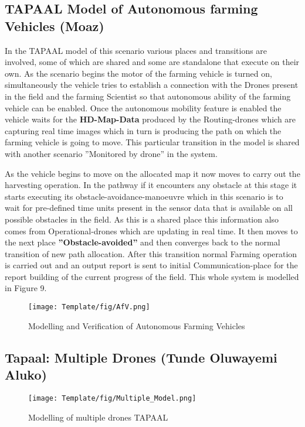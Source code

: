 \documentclass[english]{lni}
\begin{document}
\subsection{TAPAAL Model of Autonomous farming Vehicles (Moaz)}
In the TAPAAL model of this scenario various places and transitions are involved, some of which are shared and some are standalone that execute on their own.  As the scenario begins the motor of the farming vehicle is turned on, simultaneously the vehicle tries to establish a connection with the Drones present in the field and the farming Scientist so that autonomous ability of the farming vehicle can be enabled. Once the autonomous mobility feature is enabled the vehicle waits for the \textbf{HD-Map-Data} produced by the Routing-drones which are  capturing real time images which in turn is producing the path on which the farming vehicle is going to move. This particular transition in the model is shared with another scenario ''Monitored by drone'' in the system.\par
As the vehicle begins to move on the allocated map it now moves to carry out the harvesting operation. In the pathway if it encounters any obstacle at this stage it starts executing its obstacle-avoidance-manoeuvre which in this scenario is to wait for pre-defined time units present in the sensor data that is available on all possible obstacles in the field. As this is a shared place this information also comes from Operational-drones which are updating in real time. It then moves  to the next place \textbf{''Obstacle-avoided''}  and then converges back to the normal transition of new path allocation. After this transition normal Farming operation is carried out and an output report is sent to initial Communication-place for the report building of the current progress of the field. This whole system is modelled in Figure 9.
\begin{figure}
    \texttt{[image: Template/fig/AfV.png]}
    \centering
    \caption{Modelling and Verification of Autonomous Farming Vehicles}
\end{figure}

\subsection{Tapaal: Multiple Drones (Tunde Oluwayemi Aluko)}
\begin{figure}[htp]
    \centering
    \texttt{[image: Template/fig/Multiple\_Model.png]}
    \caption{Modelling of multiple drones TAPAAL}
    \label{fig:mutile_mod}
\end{figure}
\end{document}

